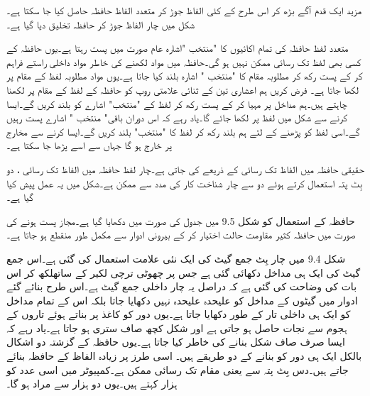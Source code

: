 مزید ایک قدم   آگے بڑھ کر اس طرح کے کئی الفاظ جوڑ کر  متعدد الفاظ حافظہ حاصل  کیا جا سکتا ہے۔شکل  میں چار الفاظ جوڑ کر حافظہ  تخلیق دیا گیا ہے۔

متعدد لفظ حافظہ  کی تمام  اکائیوں   کا "منتخب "اشارہ عام صورت میں  پست رہتا ہے۔یوں حافظہ کے  کسی بھی لفظ  تک رسائی  ممکن  نہیں ہو گی۔حافظہ میں مواد لکھنے کی خاطر مواد   داخلی راستے فراہم کر کے   پست رکھ کر  مطلوبہ مقام کا  "منتخب " اشارہ بلند کیا جاتا ہے۔یوں مواد مطلوبہ لفظ کے مقام پر لکھا جاتا ہے۔ فرض کریں ہم  اعشاری تین   کے  ثنائی علامتی روپ    کو حافظہ کے لفظ  کے مقام پر لکھنا چاہتے ہیں۔ہم مداخل پر  مہیا کر کے     پست   رکھ کر لفظ   کے  "منتخب" اشارے کو بلند   کریں گے۔ایسا کرنے سے شکل   میں لفظ   پر   لکھا  جائے گا۔یاد رہے کہ اس دوران باقی" منتخب " اشارے پست رہیں گے۔اسی لفظ کو پڑھنے کے لئے  ہم     بلند رکھ کر لفظ   کا  "منتخب"  بلند کریں گے۔ایسا کرنے سے مخارج   پر   خارج ہو گا  جہاں سے اسے  پڑھا جا سکتا ہے۔


حقیقی حافظہ میں الفاظ تک رسائی  کے ذریعے  کی جاتی ہے۔چار لفظ حافظہ میں  الفاظ  تک رسائی  ، دو بِٹ پتہ  استعمال کرتے ہوئے دو سے چار شناخت کار کی مدد سے ممکن ہے۔شکل   میں یہ عمل پیش کیا گیا  ہے۔


	حافظہ کے استعمال کو شکل 9.5 میں جدول کی صورت میں دکھایا گیا ہے۔مجاز پست ہونے کی صورت میں حافظہ کثیر مقاومت حالت اختیار کر کے بیرونی ادوار سے مکمل طور منقطع ہو جاتا ہے۔


	شکل 9.4 میں چار بِٹ جمع گیٹ کی ایک نئی علامت استعمال کی گئی ہے۔اس جمع گیٹ کی ایک ہی مداخل دکھائی گئی ہے جس پر چھوٹی ترچی لکیر کے ساتھلکھ کر اس بات کی وضاحت کی گئی ہے کہ دراصل یہ چار داخلی جمع گیٹ ہے۔اس طرح بنائے گئے ادوار میں گیٹوں کے مداخل کو علیحدہ علیحدہ نہیں دکھایا جاتا بلکہ اس کے تمام مداخل کو ایک ہی داخلی تار کے طور دکھایا جاتا ہے۔یوں دور کو کاغذ پر بناتے ہوئے تاروں کے ہجوم سے نجات حاصل ہو جاتی ہے اور شکل کچھ صاف ستری ہو جاتا ہے۔یاد رہے کہ ایسا صرف صاف شکل بنانے کی خاطر کیا جاتا ہے۔یوں حافظہ کے گزشتہ دو اشکال بالکل ایک ہی دور کو بنانے کے دو طریقے ہیں۔
	اسی طرز پر زیادہ الفاظ کے حافظہ بنائے جاتے ہیں۔دس بِٹ پتہ سے  یعنی مقام تک رسائی ممکن ہے۔کمپیوٹر میں اسی عدد کو ہزار کہتے ہیں۔یوں دو ہزار سے مراد ہو گا۔


